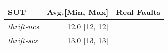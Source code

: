 \begin{tabular}{ l r r  }\\ 
\toprule 
SUT & Avg.[Min, Max]  & Real Faults \\ 
\midrule 
\emph{thrift-ncs}&12.0 [12, 12]&  \\ 
\emph{thrift-scs}&13.0 [13, 13]&  \\ 
\bottomrule 
\end{tabular} 
